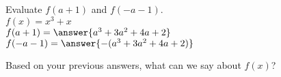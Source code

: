 \documentclass{ximera}
\author{David Kish}
\begin{document}
\begin{exercise}
Evaluate $f(a+1)$ and $f(-a-1)$.\\
$f(x)= x^3+x$\\
$f(a+1)=\answer{a^3+3a^2+4a+2}$\\
$f(-a-1)=\answer{-(a^3+3a^2+4a+2)}$
\end{exercise}
\begin{exercise}
Based on your previous answers, what can we say about $f(x)$?
\begin{multipleChoice}
\end{multipleChoice}
\end{exercise}
\end{document}
